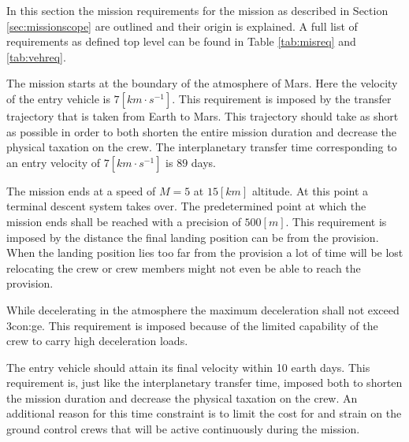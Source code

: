 In this section the mission requirements for the mission as described in Section \ref{sec:missionscope} are outlined and their origin is explained. A full list of requirements as defined top level can be found in Table \ref{tab:misreq} and \ref{tab:vehreq}.

The mission starts at the boundary of the atmosphere of Mars. Here the velocity of the entry vehicle is $7 \left[km \cdot s^{-1} \right]$. This requirement is imposed by the transfer trajectory that is taken from Earth to Mars. This trajectory should take as short as possible in order to both shorten the entire mission duration and decrease the physical taxation on the crew. The interplanetary transfer time corresponding to an entry velocity of $7 \left[km \cdot s^{-1} \right]$ is $89$ days. 

The mission ends at a speed of $M=5$ at $15 \left[km\right]$ altitude. At this point a terminal descent system takes over. The predetermined point at which the mission ends shall be reached with a precision of $500 \left[m\right]$. This requirement is imposed by the distance the final landing position can be from the provision. When the landing position lies too far from the provision a lot of time will be lost relocating the crew or crew members might not even be able to reach the provision.

While decelerating in the atmosphere the maximum deceleration shall not exceed 3\gls{con:ge}. This requirement is imposed because of the limited capability of the crew to carry high deceleration loads.

The entry vehicle should attain its final velocity within 10 earth days. This requirement is, just like the interplanetary transfer time, imposed both to shorten the mission duration and decrease the physical taxation on the crew. An additional reason for this time constraint is to limit the cost for and strain on the ground control crews that will be active continuously during the mission.


